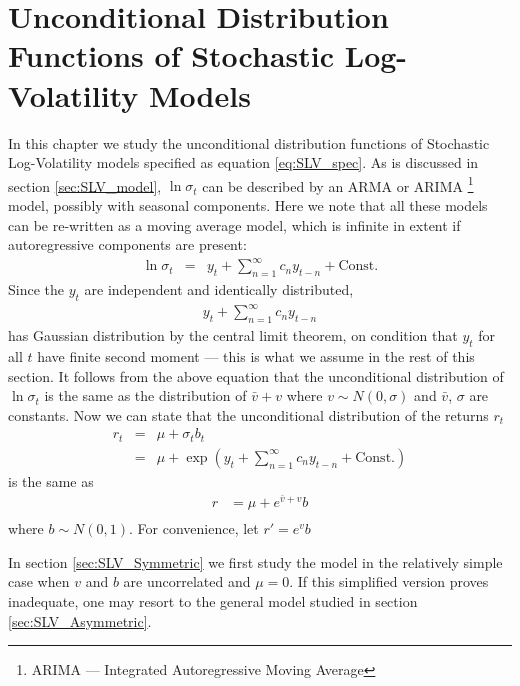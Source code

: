 \chapter{Unconditional Distribution Functions of Stochastic
  Log-Volatility Models}
\label{chp:SLV_unconditional}
In this chapter we study the unconditional distribution functions of
Stochastic Log-Volatility models specified as equation
\ref{eq:SLV_spec}. As is discussed in section \ref{sec:SLV_model},
$\ln\sigma_t$ can be described by an ARMA or ARIMA \footnote{ARIMA ---
  Integrated Autoregressive Moving Average} model, possibly with
seasonal components. Here we note that all these models can be
re-written as a moving average model, which is infinite in extent if
autoregressive components are present:
\begin{eqnarray*}
  \ln \sigma_t &=& y_t + \sum_{n=1}^\infty c_n y_{t-n} + \text{Const.}
\end{eqnarray*}
Since the $y_t$ are independent and identically distributed,
\begin{eqnarray*}
  y_t + \sum_{n=1}^\infty c_n y_{t-n}  
\end{eqnarray*}
has Gaussian distribution by the central limit theorem, on condition
that $y_t$ for all $t$ have finite second moment --- this is what we
assume in the rest of this section. It follows from the above equation
that the unconditional distribution of $\ln \sigma_t$ is the same as the
distribution of $\bar{v} + v$ where $v \sim N(0, \sigma)$ and
$\bar{v}$, $\sigma$ are constants. Now we can state that the
unconditional distribution of the returns $r_t$
\begin{eqnarray*}
  r_t &=& \mu + \sigma_t b_t\\
  &=& \mu + \exp\left(
    y_t + \sum_{n=1}^\infty c_n y_{t-n} + \text{Const.}
  \right)
\end{eqnarray*}
 is the same as
\begin{equation}  \label{eq:UnconditionalPdf}
  \begin{aligned}
    r &= \mu + e^{\bar{v} + v} b \\
  \end{aligned}
\end{equation}
where $b \sim N(0, 1)$. For convenience, let $r' = e^v b$

In section \ref{sec:SLV_Symmetric} we first study the model in the
relatively simple case when $v$ and $b$ are uncorrelated and $\mu
= 0$. If this simplified version proves inadequate, one may resort to
the general model studied in section \ref{sec:SLV_Asymmetric}.

